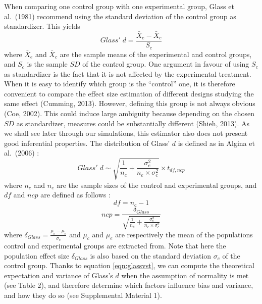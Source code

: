 \documentclass[
  english,
  man,floatsintext]{apa6}
\begin{document}
When comparing one control group with one experimental group, Glass et al.~(1981) recommend using the standard deviation of the control group as standardizer. This yields
\begin{equation*} 
Glass' \; d = \frac{\bar{X}_{e} - \bar{X}_{c}}{S_{c}}
\label{eqn:Glassds}
\end{equation*}
where \(\bar{X}_{e}\) and \(\bar{X}_{c}\) are the sample means of the experimental and control groups, and \(S_{c}\) is the sample \(SD\) of the control group. One argument in favour of using \(S_c\) as standardizer is the fact that it is not affected by the experimental treatment. When it is easy to identify which group is the ``control'' one, it is therefore convenient to compare the effect size estimation of different designs studying the same effect (Cumming, 2013). However, defining this group is not always obvious (Coe, 2002). This could induce large ambiguity because depending on the chosen \(SD\) as standardizer, measures could be substantially different (Shieh, 2013). As we shall see later through our simulations, this estimator also does not present good inferential properties. The distribution of Glass' \(d\) is defined as in Algina et al.~(2006) :
\begin{equation} 
Glass' \; d \sim \sqrt{\frac{1}{n_{c}}+\frac{\sigma_{e}^2}{n_{e} \times \sigma^2_{c}}} \times t_{df,ncp}
\label{eqn:glassvst}
\end{equation}
where \(n_c\) and \(n_e\) are the sample sizes of the control and experimental groups, and \(df\) and \(ncp\) are defined as follows :
\begin{equation} 
df = n_{c}-1
\label{eqn:glassdf}
\end{equation}
\begin{equation*} 
ncp = \frac{\delta_{Glass}}{\sqrt{\frac{1}{n_{c}} + \frac{\sigma_{e}^2}{n_{e} \times \sigma^2_{c}}}}
\label{eqn:glassncp}
\end{equation*}
where \(\delta_{Glass} = \frac{\mu_{c}-\mu_{e}}{\sigma_{c}}\) and \(\mu_c\) and \(\mu_e\) are respectively the mean of the populations control and experimental groups are extracted from. Note that here the population effect size \(\delta_{Glass}\) is also based on the standard deviation \(\sigma_c\) of the control group. Thanks to equation \ref{eqn:glassvst}, we can compute the theoretical expectation and variance of Glass's \(d\) when the assumption of normality is met (see Table 2), and therefore determine which factors influence bias and variance, and how they do so (see Supplemental Material 1).
\end{document}
